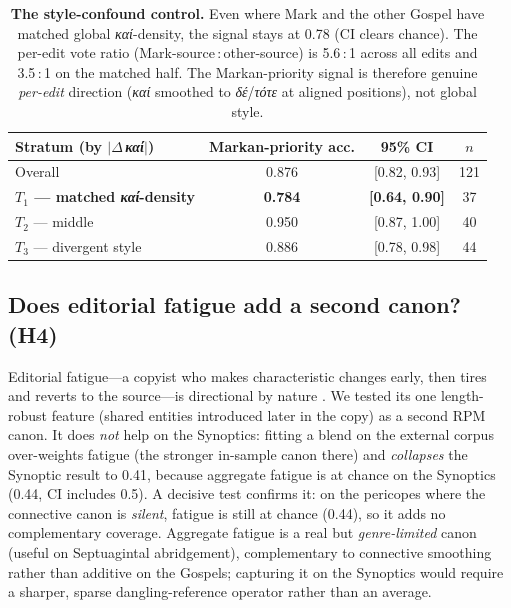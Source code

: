 \documentclass[11pt,letterpaper]{article}
\newcommand{\gk}[1]{{\greekfont\itshape #1}}
\newcommand{\tblhead}{\rowcolor{marine!12}}
\begin{document}
\begin{table}[H]
\centering
\small
\begin{tabular}{lccc}
\toprule
\tblhead\textbf{Stratum (by $|\Delta\,$\gk{καί}$|$)} & \textbf{Markan-priority acc.} & \textbf{95\% CI} & \textbf{$n$} \\
\midrule
Overall & 0.876 & [0.82, 0.93] & 121 \\
\rowcolor{papyrus}\textbf{$T_1$ --- matched \gk{καί}-density} & \textbf{0.784} & \textbf{[0.64, 0.90]} & 37 \\
$T_2$ --- middle & 0.950 & [0.87, 1.00] & 40 \\
$T_3$ --- divergent style & 0.886 & [0.78, 0.98] & 44 \\
\bottomrule
\end{tabular}
\caption{\textbf{The style-confound control.} Even where Mark and the other Gospel have matched
global \gk{καί}-density, the signal stays at 0.78 (CI clears chance). The per-edit vote ratio
(Mark-source\,:\,other-source) is 5.6\,:\,1 across all edits and 3.5\,:\,1 on the matched half.
The Markan-priority signal is therefore genuine \textit{per-edit} direction (\gk{καί} smoothed to
\gk{δέ}/\gk{τότε} at aligned positions), not global style.}
\label{tab:control}
\end{table}

\subsection{Does editorial fatigue add a second canon? (H4)}

Editorial fatigue---a copyist who makes characteristic changes early, then tires and reverts to
the source---is directional by nature \citep{goodacre1998}. We tested its one length-robust
feature (shared entities introduced later in the copy) as a second RPM canon. It does \textit{not}
help on the Synoptics: fitting a blend on the external corpus over-weights fatigue (the stronger
in-sample canon there) and \textit{collapses} the Synoptic result to 0.41, because aggregate
fatigue is at chance on the Synoptics (0.44, CI includes 0.5). A decisive test confirms it: on the
pericopes where the connective canon is \textit{silent}, fatigue is still at chance (0.44), so it
adds no complementary coverage. Aggregate fatigue is a real but \textit{genre-limited} canon
(useful on Septuagintal abridgement), complementary to connective smoothing rather than additive
on the Gospels; capturing it on the Synoptics would require a sharper, sparse dangling-reference
operator rather than an average.
\end{document}
